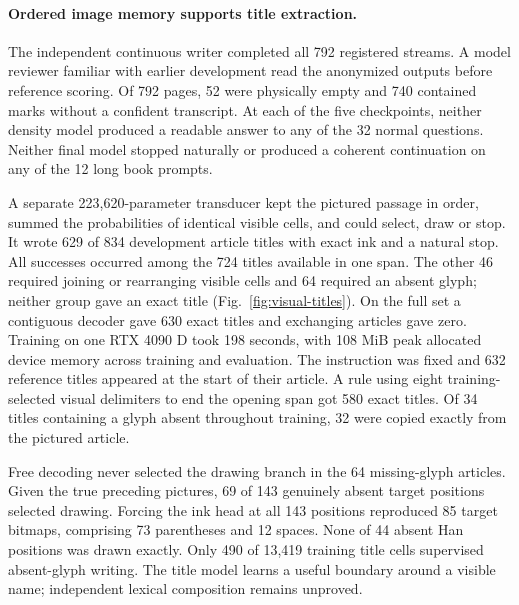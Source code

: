 \documentclass[12pt,a4paper]{article}
\providecommand{\DIFadd}[1]{{\protect\color{blue} \sf #1}} %
\begin{document}
\paragraph{\DIFadd{Ordered image memory supports title extraction.}}
\DIFadd{The independent continuous writer completed all 792 registered streams.
A model reviewer familiar with earlier development read the anonymized
outputs before reference scoring. Of 792 pages, 52 were physically empty
and 740 contained marks without a confident transcript. At each of the five
checkpoints, neither density model produced a readable answer to any of
the 32 normal questions. Neither final model stopped naturally or produced
a coherent continuation on any of the 12 long book prompts.
}

\DIFadd{A separate 223,620-parameter transducer kept the pictured passage in order,
summed the probabilities of identical visible cells, and could select,
draw or stop. It wrote 629 of 834 development article titles with exact
ink and a natural stop. All successes occurred among the 724 titles
available in one span. The other 46 required joining or rearranging
visible cells and 64 required an absent glyph; neither group gave an
exact title (Fig.~\ref{fig:visual-titles}). On the full set a contiguous
decoder gave 630 exact titles and exchanging articles gave zero.
Training on one RTX 4090 D took 198 seconds, with 108 MiB peak allocated
device memory across training and evaluation. The instruction was fixed
and 632 reference titles appeared at the start of their article. A rule
using eight training-selected visual delimiters to end the opening span
got 580 exact titles. Of 34 titles containing a glyph absent throughout
training, 32 were copied exactly from the pictured article.
}

\DIFadd{Free decoding never selected the drawing branch in the 64 missing-glyph
articles. Given the true preceding pictures, 69 of 143 genuinely absent
target positions selected drawing. Forcing the ink head at all 143
positions reproduced 85 target bitmaps, comprising 73 parentheses and
12 spaces. None of 44 absent Han positions was drawn exactly. Only 490
of 13,419 training title cells supervised absent-glyph writing. The title
model learns a useful boundary around a visible name; independent lexical
composition remains unproved.
}
\end{document}
